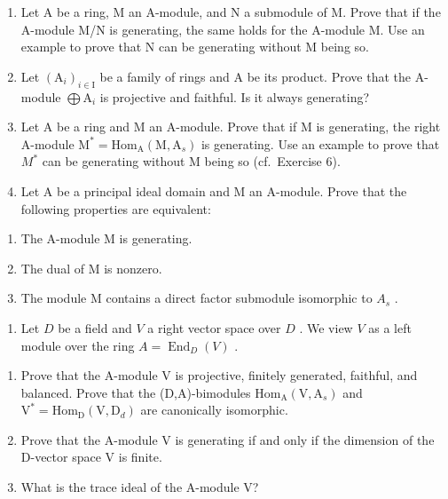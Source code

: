 \begin{enumerate}
\def\labelenumi{\arabic{enumi})}
\setcounter{enumi}{4}
\item
  Let A be a ring, M an A-module, and N a submodule of M. Prove that if the A-module M/N is generating, the same holds for the A-module M. Use an example to prove that N can be generating without M being so.
\item
  Let \((\mathrm{A}_i)_{i\in \mathrm{I}}\) be a family of rings and A be its product. Prove that the A-module \(\bigoplus \mathrm{A}_i\) is projective and faithful. Is it always generating?
\item
  Let A be a ring and M an A-module. Prove that if M is generating, the right A-module \(\mathrm{M}^{*} = \mathrm{Hom}_{\mathrm{A}}(\mathrm{M}, \mathrm{A}_{s})\) is generating. Use an example to prove that \(M^{*}\) can be generating without M being so (cf.~Exercise 6).
\item
  Let A be a principal ideal domain and M an A-module. Prove that the following properties are equivalent:
\end{enumerate}

\begin{enumerate}
\def\labelenumi{(\roman{enumi})}
\item
  The A-module M is generating.
\item
  The dual of M is nonzero.
\item
  The module M contains a direct factor submodule isomorphic to \(A_{s}\) .
\end{enumerate}

\begin{enumerate}
\def\labelenumi{\arabic{enumi})}
\setcounter{enumi}{8}
\tightlist
\item
  Let \(D\) be a field and \(V\) a right vector space over \(D\) . We view \(V\) as a left module over the ring \(A = \operatorname{End}_D(V)\) .
\end{enumerate}

\begin{enumerate}
\def\labelenumi{\alph{enumi})}
\item
  Prove that the A-module V is projective, finitely generated, faithful, and balanced. Prove that the (D,A)-bimodules \(\mathrm{Hom}_{\mathrm{A}}(\mathrm{V},\mathrm{A}_{s})\) and \(\mathrm{V}^{*}=\mathrm{Hom}_{\mathrm{D}}(\mathrm{V},\mathrm{D}_{d})\) are canonically isomorphic.
\item
  Prove that the A-module V is generating if and only if the dimension of the D-vector space V is finite.
\item
  What is the trace ideal of the A-module V?
\end{enumerate}

